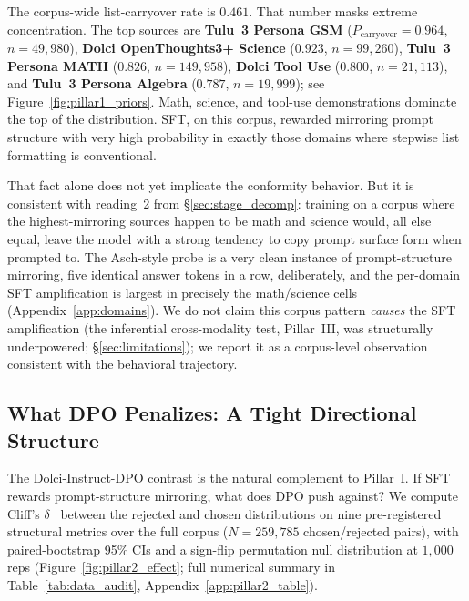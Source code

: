 \documentclass{article}
\begin{document}
The corpus-wide list-carryover rate is $0.461$. That number masks extreme concentration. The top sources are \textbf{Tulu~3 Persona GSM} ($P_{\text{carryover}}{=}0.964$, $n{=}49{,}980$), \textbf{Dolci OpenThoughts3+ Science} ($0.923$, $n{=}99{,}260$), \textbf{Tulu~3 Persona MATH} ($0.826$, $n{=}149{,}958$), \textbf{Dolci Tool Use} ($0.800$, $n{=}21{,}113$), and \textbf{Tulu~3 Persona Algebra} ($0.787$, $n{=}19{,}999$); see Figure~\ref{fig:pillar1_priors}. Math, science, and tool-use demonstrations dominate the top of the distribution. SFT, on this corpus, rewarded mirroring prompt structure with very high probability in exactly those domains where stepwise list formatting is conventional.

That fact alone does not yet implicate the conformity behavior. But it is consistent with reading~2 from \S\ref{sec:stage_decomp}: training on a corpus where the highest-mirroring sources happen to be math and science would, all else equal, leave the model with a strong tendency to copy prompt surface form when prompted to. The Asch-style probe is a very clean instance of prompt-structure mirroring, five identical answer tokens in a row, deliberately, and the per-domain SFT amplification is largest in precisely the math/science cells (Appendix~\ref{app:domains}). We do not claim this corpus pattern \emph{causes} the SFT amplification (the inferential cross-modality test, Pillar~III, was structurally underpowered; \S\ref{sec:limitations}); we report it as a corpus-level observation consistent with the behavioral trajectory.

\subsection{What DPO Penalizes: A Tight Directional Structure}
\label{sec:pillar2}

\noindent The Dolci-Instruct-DPO contrast is the natural complement to Pillar~I. If SFT rewards prompt-structure mirroring, what does DPO push against? We compute Cliff's $\delta$~\citep{cliff1993dominance} between the rejected and chosen distributions on nine pre-registered structural metrics over the full corpus ($N{=}259{,}785$ chosen/rejected pairs), with paired-bootstrap 95\% CIs and a sign-flip permutation null distribution at $1{,}000$ reps (Figure~\ref{fig:pillar2_effect}; full numerical summary in Table~\ref{tab:data_audit}, Appendix~\ref{app:pillar2_table}).
\end{document}
